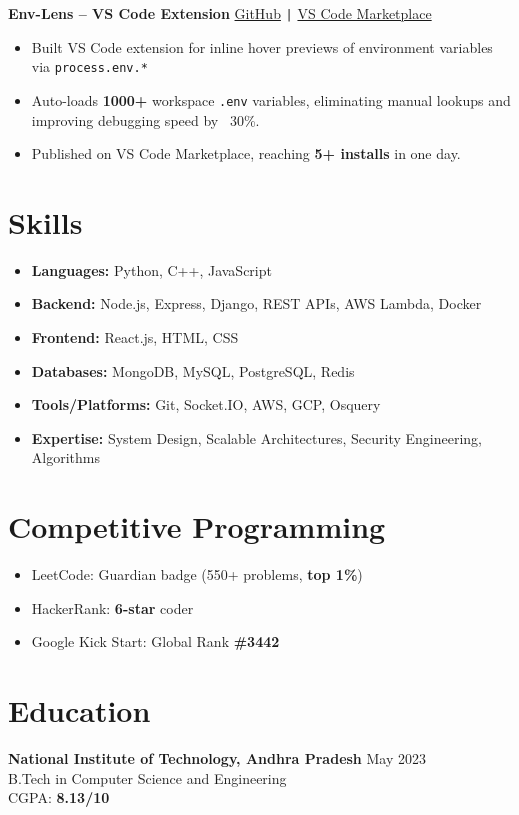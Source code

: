 \documentclass[a4paper,10pt]{article}
\newcommand{\resumeItem}[1]{\item\small{#1}}
\begin{document}
\vspace{6pt}

\textbf{Env-Lens – VS Code Extension} \hfill \href{https://github.com/mohankumarkadiri/env-lens}{GitHub} \texttt{|}
\href{https://marketplace.visualstudio.com/items?itemName=mohankumarkadiri.env-lens&ssr=false}{VS Code Marketplace}
\vspace{3pt}
\begin{itemize}[leftmargin=*,itemsep=2pt]
  \resumeItem{Built VS Code extension for inline hover previews of environment variables via \texttt{process.env.*}}
  \resumeItem{Auto-loads \textbf{1000+} workspace \texttt{.env} variables, eliminating manual lookups and improving debugging speed by ~30\%.}
  \resumeItem{Published on VS Code Marketplace, reaching \textbf{5+ installs} in one day.}

\end{itemize}

\section*{Skills}
\begin{itemize}[leftmargin=*,itemsep=2pt]
  \resumeItem{\textbf{Languages:} Python, C++, JavaScript}
  \resumeItem{\textbf{Backend:} Node.js, Express, Django, REST APIs, AWS Lambda, Docker}
  \resumeItem{\textbf{Frontend:} React.js, HTML, CSS}
  \resumeItem{\textbf{Databases:} MongoDB, MySQL, PostgreSQL, Redis}
  \resumeItem{\textbf{Tools/Platforms:} Git, Socket.IO, AWS, GCP, Osquery}
  \resumeItem{\textbf{Expertise:} System Design, Scalable Architectures, Security Engineering, Algorithms}

\end{itemize}

\section*{Competitive Programming}
\begin{itemize}[leftmargin=*,itemsep=2pt]
  \resumeItem{LeetCode: Guardian badge (550+ problems, \textbf{top 1\%})}  
  \resumeItem{HackerRank: \textbf{6-star} coder}  
  \resumeItem{Google Kick Start: Global Rank \textbf{\#3442}}
\end{itemize}

\section*{Education}
\textbf{National Institute of Technology, Andhra Pradesh} \hfill May 2023\\
B.Tech in Computer Science and Engineering\\
CGPA: \textbf{8.13/10}
\end{document}
